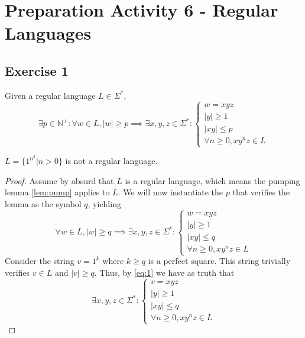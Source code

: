 \documentclass[docid=PA06]{tcom_PA}
\begin{document}
\setcounter{section}{5}
\section{Preparation Activity 6 - Regular Languages}
{
\renewcommand{\thesubsubsection}{\thesubsection\alph{subsubsection}}
\subsection{Exercise 1}
\begin{lemma} \label{lem:pump}
Given a regular language $L \in \Sigma^*$,
\begin{equation*}
	\exists p \in \mathbb{N}^+ \colon \forall w \in L, |w|\geq p \implies
	\exists x,y,z \in \Sigma^* \colon
	\begin{cases}
		w=xyz\\
		|y|\geq 1\\
		|xy|\leq p\\
		\forall n \geq 0, x y^n z \in L
	\end{cases}
\end{equation*}
\end{lemma}
\begin{theorem}
	$L=\{1^{n^2} | n>0\}$ is not a regular language.
\end{theorem}
\begin{proof}
Assume by absurd that $L$ is a regular language, which means the pumping lemma \eqref{lem:pump} applies to $L$. We will now instantiate the $p$ that verifies the lemma as the symbol $q$, yielding
	\begin{equation} \label{eq:1}
	\forall w \in L, |w|\geq q \implies
	\exists x,y,z \in \Sigma^* \colon
	\begin{cases}
		w=xyz\\
		|y|\geq 1\\
		|xy|\leq q\\
		\forall n \geq 0, x y^n z \in L
	\end{cases}
\end{equation}
Consider the string $v=1^k$ where $k\geq q$ is a perfect square. This string trivially verifies $v \in L$ and $|v|\geq q$. Thus, by \eqref{eq:1} we have as truth that
\begin{equation}\label{eq:3}
	\exists x,y,z \in \Sigma^* \colon
	\begin{cases}
		v=xyz\\
		|y|\geq 1\\
		|xy|\leq q\\
		\forall n \geq 0, x y^n z \in L

\end{cases}
\end{equation}
\end{proof}}
\end{document}
